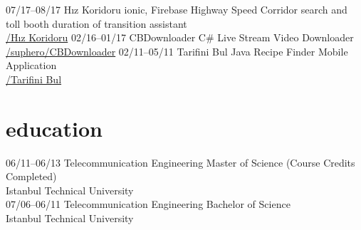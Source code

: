 \documentclass[]{friggeri-cv} %
\begin{document}
\begin{entrylist}
\entry
{07/17--08/17}
{Hız Koridoru}
{ionic, Firebase}
{Highway Speed Corridor search and toll booth duration of transition assistant
\\\href{https://play.google.com/store/apps/details?id=com.harunsokullu.speedcorridor}{\faAndroid/Hız Koridoru}}
\entry
{02/16--01/17}
{CBDownloader}
{C\#}
{Live Stream Video Downloader
\\\href{https://github.com/suphero/CBDownloader}{\faGithub/suphero/CBDownloader}}
\entry
{02/11--05/11}
{Tarifini Bul}
{Java}
{Recipe Finder Mobile Application
\\\href{https://play.google.com/store/apps/details?id=com.tarifinibul}{\faAndroid/Tarifini Bul}}

\end{entrylist}

\section{education}

\begin{entrylist}

\entry
{06/11--06/13}
{Telecommunication Engineering}{}
{Master of Science (Course Credits Completed)
\\Istanbul Technical University}
\\
\entry
{07/06--06/11}
{Telecommunication Engineering}{}
{Bachelor of Science
\\Istanbul Technical University}
	
\end{entrylist}
\end{document}
